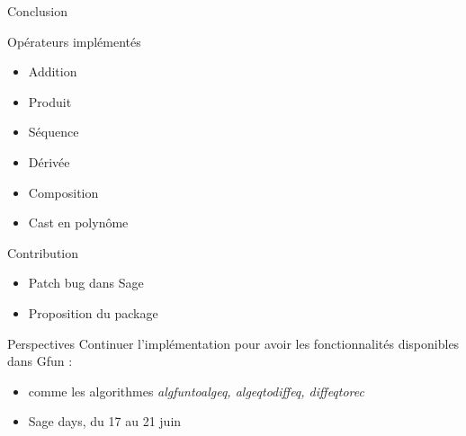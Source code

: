 \documentclass{beamer}
\begin{document}
\begin{frame}{Conclusion}
\begin{block}{Opérateurs implémentés}
\begin{itemize}
\item Addition
\item Produit
\item Séquence
\item Dérivée
\item Composition
\item Cast en polynôme
\end{itemize}
\end{block}
\pause
\begin{block}{Contribution}
\begin{itemize}
\item Patch bug dans Sage
\item Proposition du package
\end{itemize}
\end{block}
\end{frame}

\begin{frame}{Perspectives}
Continuer l'impl\'ementation pour avoir les fonctionnalit\'es disponibles dans Gfun :
\begin{itemize}
\item comme les algorithmes \textit{algfuntoalgeq, algeqtodiffeq, diffeqtorec}
\item Sage days, du 17 au 21 juin
\end{itemize}
\end{frame}
\end{document}
